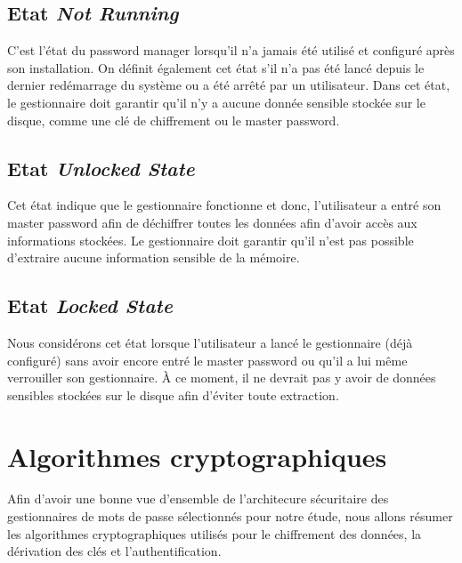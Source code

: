 \subsection{Etat \textit{Not Running}}
C'est l'état du password manager lorsqu'il n'a jamais été utilisé et configuré après son installation. On définit également cet état s'il n'a pas été lancé depuis le dernier redémarrage du système ou a été arrêté par un utilisateur. Dans cet état, le gestionnaire doit garantir qu'il n'y a aucune donnée sensible stockée sur le disque, comme une clé de chiffrement ou le master password.
\subsection{Etat \textit{Unlocked State}}
Cet état indique que le gestionnaire fonctionne et donc, l'utilisateur a entré son master password afin de déchiffrer toutes les données afin d'avoir accès aux informations stockées. Le gestionnaire doit garantir qu'il n'est pas possible d'extraire aucune information sensible de la mémoire.
\subsection{Etat \textit{Locked State}}
Nous considérons cet état lorsque l'utilisateur a lancé le gestionnaire (déjà configuré) sans avoir encore entré le master password ou qu'il a lui même verrouiller son gestionnaire. À ce moment, il ne devrait pas y avoir de données sensibles stockées sur le disque afin d'éviter toute extraction. 
\section{Algorithmes cryptographiques}
Afin d'avoir une bonne vue d'ensemble de l'architecure sécuritaire des gestionnaires de mots de passe sélectionnés pour notre étude, nous allons résumer les algorithmes cryptographiques utilisés pour le chiffrement des données, la dérivation des clés et l'authentification.

